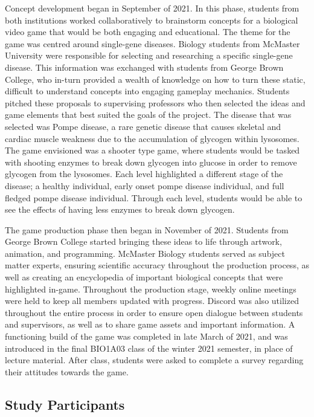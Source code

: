 \documentclass[10pt]{article}
\begin{document}
Concept development began in September of 2021. In this phase, students from both institutions worked collaboratively to brainstorm concepts for a biological video game that would be both engaging and educational. The theme for the game was centred around single-gene diseases. Biology students from McMaster University were responsible for selecting and researching a specific single-gene disease. This information was exchanged with students from George Brown College, who in-turn provided a wealth of knowledge on how to turn these static, difficult to understand concepts into engaging gameplay mechanics. Students pitched these proposals to supervising professors who then selected the ideas and game elements that best suited the goals of the project. The disease that was selected was Pompe disease, a rare genetic disease that causes skeletal and cardiac muscle weakness due to the accumulation of glycogen within lysosomes. The game envisioned was a shooter type game, where students would be tasked with shooting enzymes to break down glycogen into glucose in order to remove glycogen from the lysosomes. Each level highlighted a different stage of the disease; a healthy individual, early onset pompe disease individual, and full fledged pompe disease individual. Through each level, students would be able to see the effects of having less enzymes to break down glycogen.

The game production phase then began in November of 2021. Students from George Brown College started bringing these ideas to life through artwork, animation, and programming. McMaster Biology students served as subject matter experts, ensuring scientific accuracy throughout the production process, as well as creating an encyclopedia of important biological concepts that were highlighted in-game. Throughout the production stage, weekly online meetings were held to keep all members updated with progress. Discord was also utilized throughout the entire process in order to ensure open dialogue between students and supervisors, as well as to share game assets and important information. A functioning build of the game was completed in late March of 2021, and was introduced in the final BIO1A03 class of the winter 2021 semester, in place of lecture material. After class, students were asked to complete a survey regarding their attitudes towards the game.

\subsection{Study Participants}
\end{document}
